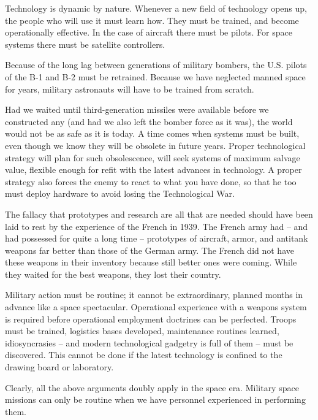 Technology is dynamic by nature. Whenever a new field of technology opens up, the people who will use it must learn how. They must be trained, and become operationally effective. In the case of aircraft there must be pilots. For space systems there must be satellite controllers.

Because of the long lag between generations of military bombers, the U.S. pilots of the B-1 and B-2 must be retrained. Because we have neglected manned space for years, military astronauts will have to be trained from scratch.

Had we waited until third-generation missiles were available before we constructed any (and had we also left the bomber force as it was), the world would not be as safe as it is today. A time comes when systems must be built, even though we know they will be obsolete in future years. Proper technological strategy will plan for such obsolescence, will seek systems of maximum salvage value, flexible enough for refit with the latest advances in technology. A proper strategy also forces the enemy to react to what you have done, so that he too must deploy hardware to avoid losing the Technological War.

The fallacy that prototypes and research are all that are needed should have been laid to rest by the experience of the French in 1939. The French army had -- and had possessed for quite a long time -- prototypes of aircraft, armor, and antitank weapons far better than those of the German army. The French did not have these weapons in their inventory because still better ones were coming. While they waited for the best weapons, they lost their country.

Military action must be routine; it cannot be extraordinary, planned months in advance like a space spectacular. Operational experience with a weapons system is required before operational employment doctrines can be perfected. Troops must be trained, logistics bases developed, maintenance routines learned, idiosyncrasies -- and modern technological gadgetry is full of them -- must be discovered. This cannot be done if the latest technology is confined to the drawing board or laboratory.

Clearly, all the above arguments doubly apply in the space era. Military space missions can only be routine when we have personnel experienced in performing them.

